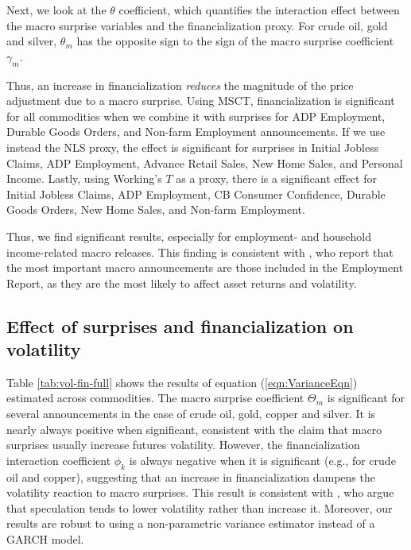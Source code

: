Next, we look at the $\theta$ coefficient, which quantifies the interaction effect between the macro surprise variables and the financialization proxy. For crude oil, gold and silver, $\theta_m$ has the opposite sign to the sign of the macro surprise coefficient $\gamma_m$. 

Thus, an increase in financialization \emph{reduces} the magnitude of the price adjustment due to a macro surprise. Using MSCT, financialization is significant for all commodities when we combine it with surprises for ADP Employment, Durable Goods Orders, and Non-farm Employment announcements. If we use instead the NLS proxy, the effect is significant for surprises in Initial Jobless Claims, ADP Employment, Advance Retail Sales, New Home Sales, and Personal Income. Lastly, using Working's $T$ as a proxy, there is a significant effect for Initial Jobless Claims, ADP Employment, CB Consumer Confidence, Durable Goods Orders, New Home Sales, and Non-farm Employment. 

Thus, we find significant results, especially for employment- and household income-related macro releases. This finding is consistent with \citet*{hordahl2020expectations}, who report that the most important macro announcements are those included in the Employment Report, as they are the most likely to affect asset returns and volatility. 




\subsection{Effect of surprises and financialization on volatility}
	
Table \ref{tab:vol-fin-full} shows the results of equation (\ref{eqn:VarianceEqn}) estimated across commodities.  The macro surprise coefficient $\Theta_m$ is significant for several announcements in the case of crude oil, gold, copper and silver. It is nearly always positive when significant, consistent with the claim that macro surprises usually increase futures volatility. However, the financialization interaction coefficient $\phi_k$ is always negative when it is significant (e.g., for crude oil and copper), suggesting that an increase in financialization dampens the volatility reaction to macro surprises. This result is consistent with \citet{brunetti2016speculators}, who argue that speculation tends to lower volatility rather than increase it.  Moreover, our results are robust to using a non-parametric variance estimator instead of a GARCH model.


